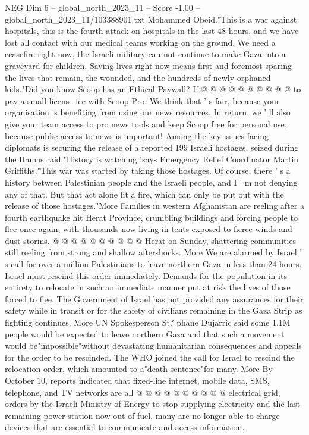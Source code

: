 \begin{textsample}{NEG Dim 6 – global\_north\_2023\_11 – Score -1.00 – global\_north\_2023\_11/103388901.txt}
Mohammed Obeid."This is a war against hospitals, this is the fourth attack on hospitals in the last 48 hours, and we have lost all contact with our medical teams working on the ground.
We need a ceasefire right now, the Israeli military can not continue to make Gaza into a graveyard for children.
Saving lives right now means first and foremost sparing the lives that remain, the wounded, and the hundreds of newly orphaned kids."Did you know Scoop has an Ethical Paywall?
If @ @ @ @ @ @ @ @ @ @ to pay a small license fee with Scoop Pro.
We think that ' s fair, because your organisation is benefiting from using our news resources.
In return, we ' ll also give your team access to pro news tools and keep Scoop free for personal use, because public access to news is important!
Among the key issues facing diplomats is securing the release of a reported 199 Israeli hostages, seized during the Hamas raid."History is watching,"says Emergency Relief Coordinator Martin Griffiths."This war was started by taking those hostages.
Of course, there ' s a history between Palestinian people and the Israeli people, and I ' m not denying any of that.
But that act alone lit a fire, which can only be put out with the release of those hostages."More Families in western Afghanistan are reeling after a fourth earthquake hit Herat Province, crumbling buildings and forcing people to flee once again, with thousands now living in tents exposed to fierce winds and dust storms. @ @ @ @ @ @ @ @ @ @ Herat on Sunday, shattering communities still reeling from strong and shallow aftershocks.
More We are alarmed by Israel ' s call for over a million Palestinians to leave northern Gaza in less than 24 hours.
Israel must rescind this order immediately.
Demands for the population in its entirety to relocate in such an immediate manner put at risk the lives of those forced to flee.
The Government of Israel has not provided any assurances for their safety while in transit or for the safety of civilians remaining in the Gaza Strip as fighting continues.
More UN Spokesperson St? phane Dujarric said some 1.1M people would be expected to leave northern Gaza and that such a movement would be"impossible"without devastating humanitarian consequences and appeals for the order to be rescinded.
The WHO joined the call for Israel to rescind the relocation order, which amounted to a"death sentence"for many.
More By October 10, reports indicated that fixed-line internet, mobile data, SMS, telephone, and TV networks are all @ @ @ @ @ @ @ @ @ @ electrical grid, orders by the Israeli Ministry of Energy to stop supplying electricity and the last remaining power station now out of fuel, many are no longer able to charge devices that are essential to communicate and access information.

\end{textsample}
